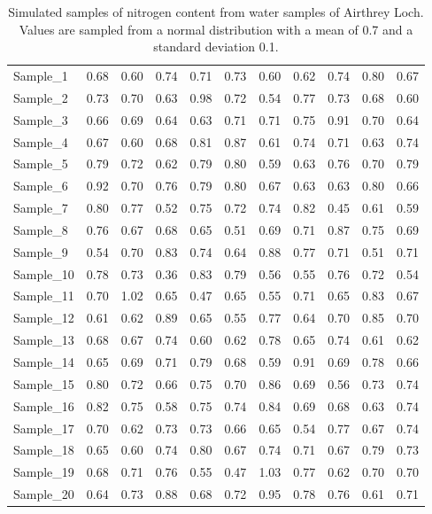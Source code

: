 \documentclass[
]{scrbook}
\begin{document}
\begin{longtable}[]{@{}lrrrrrrrrrr@{}}
\caption{\label{tab:unnamed-chunk-44}Simulated samples of nitrogen content from water samples of Airthrey Loch. Values are sampled from a normal distribution with a mean of 0.7 and a standard deviation 0.1.}\tabularnewline
\toprule
\endhead
Sample\_1 & 0.68 & 0.60 & 0.74 & 0.71 & 0.73 & 0.60 & 0.62 & 0.74 & 0.80 & 0.67 \\
Sample\_2 & 0.73 & 0.70 & 0.63 & 0.98 & 0.72 & 0.54 & 0.77 & 0.73 & 0.68 & 0.60 \\
Sample\_3 & 0.66 & 0.69 & 0.64 & 0.63 & 0.71 & 0.71 & 0.75 & 0.91 & 0.70 & 0.64 \\
Sample\_4 & 0.67 & 0.60 & 0.68 & 0.81 & 0.87 & 0.61 & 0.74 & 0.71 & 0.63 & 0.74 \\
Sample\_5 & 0.79 & 0.72 & 0.62 & 0.79 & 0.80 & 0.59 & 0.63 & 0.76 & 0.70 & 0.79 \\
Sample\_6 & 0.92 & 0.70 & 0.76 & 0.79 & 0.80 & 0.67 & 0.63 & 0.63 & 0.80 & 0.66 \\
Sample\_7 & 0.80 & 0.77 & 0.52 & 0.75 & 0.72 & 0.74 & 0.82 & 0.45 & 0.61 & 0.59 \\
Sample\_8 & 0.76 & 0.67 & 0.68 & 0.65 & 0.51 & 0.69 & 0.71 & 0.87 & 0.75 & 0.69 \\
Sample\_9 & 0.54 & 0.70 & 0.83 & 0.74 & 0.64 & 0.88 & 0.77 & 0.71 & 0.51 & 0.71 \\
Sample\_10 & 0.78 & 0.73 & 0.36 & 0.83 & 0.79 & 0.56 & 0.55 & 0.76 & 0.72 & 0.54 \\
Sample\_11 & 0.70 & 1.02 & 0.65 & 0.47 & 0.65 & 0.55 & 0.71 & 0.65 & 0.83 & 0.67 \\
Sample\_12 & 0.61 & 0.62 & 0.89 & 0.65 & 0.55 & 0.77 & 0.64 & 0.70 & 0.85 & 0.70 \\
Sample\_13 & 0.68 & 0.67 & 0.74 & 0.60 & 0.62 & 0.78 & 0.65 & 0.74 & 0.61 & 0.62 \\
Sample\_14 & 0.65 & 0.69 & 0.71 & 0.79 & 0.68 & 0.59 & 0.91 & 0.69 & 0.78 & 0.66 \\
Sample\_15 & 0.80 & 0.72 & 0.66 & 0.75 & 0.70 & 0.86 & 0.69 & 0.56 & 0.73 & 0.74 \\
Sample\_16 & 0.82 & 0.75 & 0.58 & 0.75 & 0.74 & 0.84 & 0.69 & 0.68 & 0.63 & 0.74 \\
Sample\_17 & 0.70 & 0.62 & 0.73 & 0.73 & 0.66 & 0.65 & 0.54 & 0.77 & 0.67 & 0.74 \\
Sample\_18 & 0.65 & 0.60 & 0.74 & 0.80 & 0.67 & 0.74 & 0.71 & 0.67 & 0.79 & 0.73 \\
Sample\_19 & 0.68 & 0.71 & 0.76 & 0.55 & 0.47 & 1.03 & 0.77 & 0.62 & 0.70 & 0.70 \\
Sample\_20 & 0.64 & 0.73 & 0.88 & 0.68 & 0.72 & 0.95 & 0.78 & 0.76 & 0.61 & 0.71 \\
\bottomrule
\end{longtable}
\end{document}
